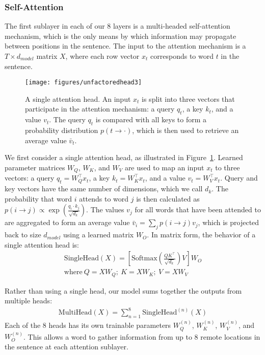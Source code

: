 \documentclass[11pt,a4paper]{article}
\begin{document}
\subsubsection{Self-Attention}
\label{subsec:self-attention}

The first sublayer in each of our 8 layers is a multi-headed self-attention mechanism, which is the only means by which information may propagate between positions in the sentence. The input to the attention mechanism is a $T\times d_{model}$ matrix $X$, where each row vector $x_t$ corresponds to word $t$ in the sentence.

\begin{figure}
  \centering
    \texttt{[image: figures/unfactoredhead3]}
    \caption{A single attention head. An input $x_t$ is split into three vectors that participate in the attention mechanism: a query $q_t$, a key $k_t$, and a value $v_t$. The query $q_t$ is compared with all keys to form a probability distribution $p(t \rightarrow \cdot)$, which is then used to retrieve an average value $\bar{v}_t$.}
    \label{fig:unfactored-head}
\end{figure}

We first consider a single attention head, as illustrated in Figure~\ref{fig:unfactored-head}. Learned parameter matrices $W_Q$, $W_K$, and $W_V$ are used to map an input $x_t$ to three vectors: a query $q_t=W_Q^\top x_t$, a key $k_t=W_K^\top x_t$, and a value $v_t=W_V^\top x_t$. Query and key vectors have the same number of dimensions, which we call $d_k$. The probability that word $i$ attends to word $j$ is then calculated as $p(i\rightarrow j) \propto \exp(\frac{q_i\cdot k_j}{\sqrt{d_k}})$. The values $v_j$ for all words that have been attended to are aggregated to form an average value $\bar{v}_i = \sum_j p(i\rightarrow j) v_j$, which is projected back to size $d_{model}$ using a learned matrix $W_O$. In matrix form, the behavior of a single attention head is:
\begin{gather*}
\mathrm{SingleHead}(X) = \left[\mathrm{Softmax}\left(\frac{QK^\top}{\sqrt{d_k}}\right)V\right] W_O \\
\text{where}~ Q = XW_Q;~ K = XW_K;~ V = XW_V
\label{eqn:qkvmatrices}
\end{gather*}

Rather than using a single head, our model sums together the outputs from multiple heads:
\begin{gather*}
\mathrm{MultiHead}(X) = \sum_{n=1}^{8} \mathrm{SingleHead}^{(n)}(X)
\end{gather*}
Each of the 8 heads has its own trainable parameters $W_Q^{(n)}$, $W_K^{(n)}$, $W_V^{(n)}$, and $W_O^{(n)}$. This allows a word to gather information from up to 8 remote locations in the sentence at each attention sublayer.
\end{document}
